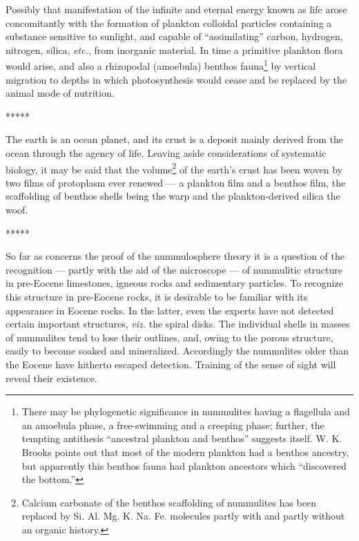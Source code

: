 \documentclass[a4paper, 12pt, oneside, landscape]{article}
\begin{document}
Possibly that manifestation of the infinite and eternal energy known as life arose concomitantly with the formation of plankton colloidal particles containing a substance sensitive to sunlight, and capable of ``assimilating'' carbon, hydrogen, nitrogen, silica, \emph{etc.}, from inorganic material. In time a primitive plankton flora would arise, and also a rhizopodal (amoebula) benthos fauna\footnote{There may be phylogenetic significance in nummulites having a flagellula and an amoebula phase, a free-swimming and a creeping phase; further, the tempting antithesis ``ancestral plankton and benthos'' suggests itself. W. K. Brooks points out that most of the modern plankton had a benthos ancestry, but apparently this benthos fauna had plankton ancestors which ``discovered the bottom.''} by vertical migration to depths in which photosynthesis would cease and be replaced by the animal mode of nutrition.

\centerline{*\hspace{15mm}*\hspace{15mm}*\hspace{15mm}*\hspace{15mm}*}
\bigskip

The earth is an ocean planet, and its crust is a deposit mainly derived from the ocean through the agency of life. Leaving aside considerations of systematic biology, it may be said that the volume\footnote{Calcium carbonate of the benthos scaffolding of nummulites has been replaced by Si. Al. Mg. K. Na. Fe. molecules partly with and partly without an organic history.} of the earth's crust has been woven by two films of protoplasm ever renewed --- a plankton film and a benthos film, the scaffolding of benthos shells being the warp and the plankton-derived silica the woof.

\centerline{*\hspace{15mm}*\hspace{15mm}*\hspace{15mm}*\hspace{15mm}*}
\bigskip

So far as concerns the proof of the nummulosphere theory it is a question of the recognition --- partly with the aid of the microscope --- of nummulitic structure in pre-Eocene limestones, igneous rocks and sedimentary particles. To recognize this structure in pre-Eocene rocks, it is desirable to be familiar with its appearance in Eocene rocks. In the latter, even the experts have not detected certain important structures, \emph{viz.} the spiral disks. The individual shells in masses of nummulites tend to lose their outlines, and, owing to the porous structure, easily to become soaked and mineralized. Accordingly the nummulites older than the Eocene have hitherto escaped detection. Training of the sense of sight will reveal their existence.
\end{document}
